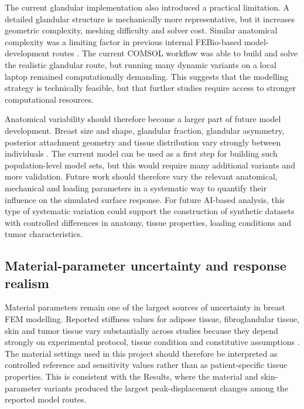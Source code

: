 The current glandular implementation also introduced a practical limitation. A detailed glandular structure is mechanically more representative, but it increases geometric complexity, meshing difficulty and solver cost. Similar anatomical complexity was a limiting factor in previous internal FEBio-based model-development routes \cite{EngelsEWSReport,StormEWSReport}. The current COMSOL workflow was able to build and solve the realistic glandular route, but running many dynamic variants on a local laptop remained computationally demanding. This suggests that the modelling strategy is technically feasible, but that further studies require access to stronger computational resources.

Anatomical variability should therefore become a larger part of future model development. Breast size and shape, glandular fraction, glandular asymmetry, posterior attachment geometry and tissue distribution vary strongly between individuals \cite{Ramiao2016,Goodbrake2022,Teixeira2023}. The current model can be used as a first step for building such population-level model sets, but this would require many additional variants and more validation. Future work should therefore vary the relevant anatomical, mechanical and loading parameters in a systematic way to quantify their influence on the simulated surface response. For future AI-based analysis, this type of systematic variation could support the construction of synthetic datasets with controlled differences in anatomy, tissue properties, loading conditions and tumor characteristics.


\subsection{Material-parameter uncertainty and response realism}
\label{discussion_material_uncertainty_response_realism}

Material parameters remain one of the largest sources of uncertainty in breast FEM modelling. Reported stiffness values for adipose tissue, fibroglandular tissue, skin and tumor tissue vary substantially across studies because they depend strongly on experimental protocol, tissue condition and constitutive assumptions \cite{Samani2007,Ramiao2016,Goodbrake2022,Teixeira2023}. The material settings used in this project should therefore be interpreted as controlled reference and sensitivity values rather than as patient-specific tissue properties. This is consistent with the Results, where the material and skin-parameter variants produced the largest peak-displacement changes among the reported model routes.

